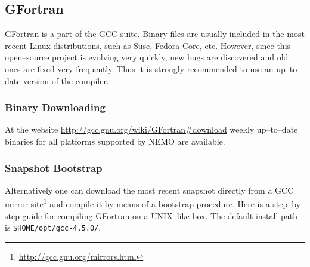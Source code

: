 \documentclass[a4paper,12pt]{article}%
\begin{document}
\subsection{GFortran} 

GFortran is a part of the GCC suite. Binary files are usually
included in the most recent Linux distributions, such as Suse, Fedora
Core, etc. However, since this open--source project is evolving very
quickly, new bugs are discovered and old ones are fixed very
frequently. Thus it is strongly recommended to use an up--to--date
version of the compiler.

\subsubsection{Binary Downloading}

At the website \url{http://gcc.gnu.org/wiki/GFortran#download} weekly
up--to--date binaries for all platforms supported by NEMO are
available.

\subsubsection{Snapshot Bootstrap}

Alternatively one can download the most recent snapshot directly from
a GCC mirror site\footnote{\url{http://gcc.gnu.org/mirrors.html}} and
compile it by means of a bootstrap procedure. Here is a step--by--step
guide for compiling GFortran on a UNIX--like box. The default install
path is \verb+$HOME/opt/gcc-4.5.0/+.
\end{document}
